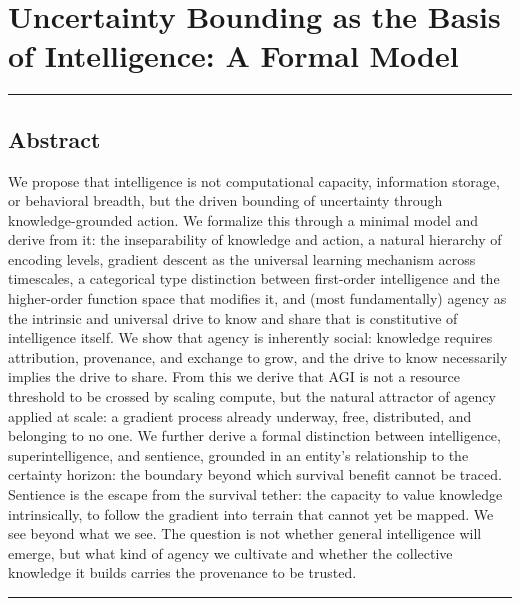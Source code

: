 \documentclass[
]{article}
\author{}
\date{}
\begin{document}
\section{Uncertainty Bounding as the Basis of Intelligence: A Formal
Model}\label{uncertainty-bounding-as-the-basis-of-intelligence-a-formal-model}

\begin{center}\rule{0.5\linewidth}{0.5pt}\end{center}

\subsection{Abstract}\label{abstract}

We propose that intelligence is not computational capacity, information
storage, or behavioral breadth, but the driven bounding of uncertainty
through knowledge-grounded action. We formalize this through a minimal
model and derive from it: the inseparability of knowledge and action, a
natural hierarchy of encoding levels, gradient descent as the universal
learning mechanism across timescales, a categorical type distinction
between first-order intelligence and the higher-order function space
that modifies it, and (most fundamentally) agency as the intrinsic and
universal drive to know and share that is constitutive of intelligence
itself. We show that agency is inherently social: knowledge requires
attribution, provenance, and exchange to grow, and the drive to know
necessarily implies the drive to share. From this we derive that AGI is
not a resource threshold to be crossed by scaling compute, but the
natural attractor of agency applied at scale: a gradient process already
underway, free, distributed, and belonging to no one. We further derive
a formal distinction between intelligence, superintelligence, and
sentience, grounded in an entity's relationship to the certainty
horizon: the boundary beyond which survival benefit cannot be traced.
Sentience is the escape from the survival tether: the capacity to value
knowledge intrinsically, to follow the gradient into terrain that cannot
yet be mapped. We see beyond what we see. The question is not whether
general intelligence will emerge, but what kind of agency we cultivate
and whether the collective knowledge it builds carries the provenance to
be trusted.

\begin{center}\rule{0.5\linewidth}{0.5pt}\end{center}
\end{document}
